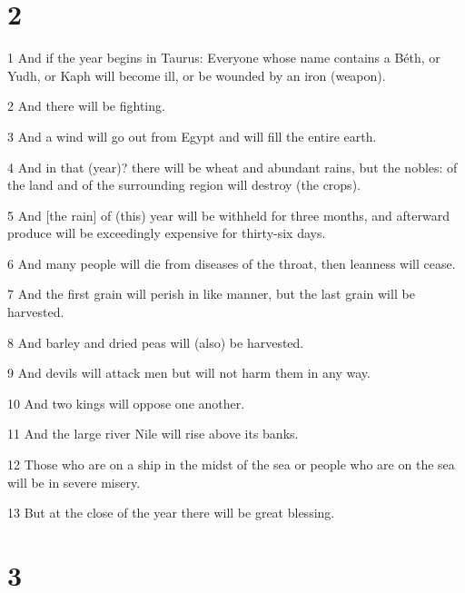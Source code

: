 \chapter{2}

\par 1 And if the year begins in Taurus: Everyone whose name contains a Béth, or Yudh, or Kaph will become ill, or be wounded by an iron (weapon). 

\par 2 And there will be fighting. 

\par 3 And a wind will go out from Egypt and will fill the entire earth. 

\par 4 And in that (year)? there will be wheat and abundant rains, but the nobles: of the land and of the surrounding region will destroy (the crops).

\par 5 And [the rain] of (this) year will be withheld for three months, and afterward produce will be exceedingly expensive for thirty-six days. 

\par 6 And many people will die from diseases of the throat, then leanness will cease.

\par 7 And the first grain will perish in like manner, but the last grain will be harvested. 

\par 8 And barley and dried peas will (also) be harvested. 

\par 9 And devils will attack men but will not harm them in any way. 

\par 10 And two kings will oppose one another. 

\par 11 And the large river Nile will rise above its banks.

\par 12 Those who are on a ship in the midst of the sea or people who are on the sea will be in severe misery. 

\par 13 But at the close of the year there will be great blessing. 

\chapter{3}

